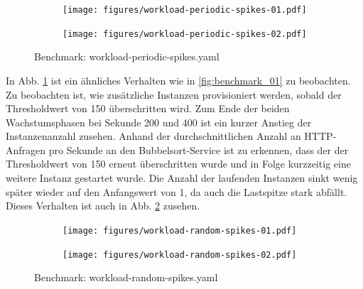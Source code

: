 \documentclass[runningheads]{llncs}
\begin{document}
\begin{figure}
	\centering
	\begin{subfigure}{.5\textwidth}
		\centering
		\texttt{[image: figures/workload-periodic-spikes-01.pdf]}
	\end{subfigure}%
	\begin{subfigure}{.5\textwidth}
		\centering
		\texttt{[image: figures/workload-periodic-spikes-02.pdf]}
	\end{subfigure}
	\caption{Benchmark: workload-periodic-spikes.yaml}
	\label{fig:benchmark_02}
\end{figure}	

In Abb. \ref{fig:benchmark_02} ist ein ähnliches Verhalten wie in  \ref{fig:benchmark_01} zu beobachten. Zu beobachten ist, wie zusätzliche Instanzen provisioniert werden, sobald der Thresholdwert von 150 überschritten wird. Zum Ende der beiden Wachstumsphasen bei Sekunde 200 und 400 ist ein kurzer Anstieg der Instanzenanzahl zusehen. Anhand der durchschnittlichen Anzahl an HTTP-Anfragen pro Sekunde an den Bubbelsort-Service ist zu erkennen, dass der der Thresholdwert von 150 erneut überschritten wurde und in Folge  kurzzeitig eine weitere Instanz gestartet wurde. Die Anzahl der laufenden Instanzen sinkt wenig später wieder auf den Anfangswert von 1, da auch die Lastspitze stark abfällt. Dieses Verhalten ist auch in Abb. \ref{fig:benchmark_03} zusehen. \\

\begin{figure}
	\centering
	\begin{subfigure}{.5\textwidth}
		\centering
		\texttt{[image: figures/workload-random-spikes-01.pdf]}
	\end{subfigure}%
	\begin{subfigure}{.5\textwidth}
		\centering
		\texttt{[image: figures/workload-random-spikes-02.pdf]}
	\end{subfigure}
	\caption{Benchmark: workload-random-spikes.yaml}
	\label{fig:benchmark_03}
\end{figure}
\end{document}
